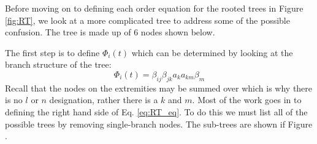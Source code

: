 \documentclass{ansconf}
\numberwithin{equation}{section}
\begin{document}
Before moving on to defining each order equation for the rooted trees in Figure \ref{fig:RT}, we look at a more complicated tree to address some of the possible confusion. The tree is made up of 6 nodes shown below. \\
\begin{center}\end{center}
The first step is to define $\Phi_i\left(t\right)$ which can be determined by looking at the branch structure of the tree:
\begin{equation}    
    \Phi_i\left(t\right) = \beta_{ij}\beta_{jk}a_{k}a_{km}\beta_{m}
\end{equation}
Recall that the nodes on the extremities may be summed over which is why there is no $l$ or $n$ designation, rather there is a $k$ and $m$. Most of the work goes in to defining the right hand side of Eq. \eqref{eq:RT_eq}. To do this we must list all of the possible trees by removing single-branch nodes. The sub-trees are shown if Figure .
\end{document}

